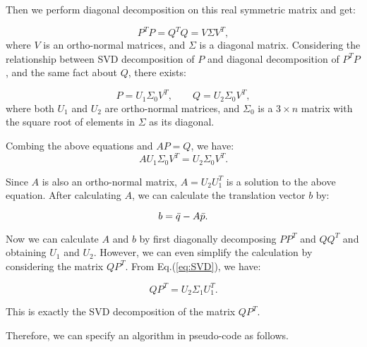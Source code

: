 \documentclass[
  course = {{16-811 Math Fundamentals for Robotics}},
  quartile = {{1}},
  assignment = 1,
  name = {{Kangle Deng}},
  email = {{kangled@andrew.cmu.edu}},
  firstexercise = 1
]{aga-homework}
\begin{document}

Then we perform diagonal decomposition on this real symmetric matrix and get:

\begin{equation*}
    P^TP = Q^TQ = V \Sigma V^T,
\end{equation*}
where $V$ is an ortho-normal matrices, and $\Sigma$ is a diagonal matrix. Considering the relationship between SVD decomposition of $P$ and diagonal decomposition of $P^TP$, and the same fact about $Q$, there exists:

\begin{equation}
    P = U_1\Sigma_0 V^T, \qquad Q = U_2\Sigma_0 V^T,
\label{eq:SVD}
\end{equation}
where both $U_1$ and $U_2$ are ortho-normal matrices, and $\Sigma_0$ is a $3 \times n$ matrix with the square root of elements in $\Sigma$ as its diagonal.

Combing the above equations and $AP=Q$, we have:
\begin{equation*}
    AU_1 \Sigma_0 V^T = U_2\Sigma_0 V^T.
\end{equation*}

Since $A$ is also an ortho-normal matrix, $A=U_2U_1^T$ is a solution to the above equation. After calculating $A$, we can calculate the translation vector $b$ by:

\begin{equation*}
    b = \Bar{q} - A\Bar{p}.
\end{equation*}

Now we can calculate $A$ and $b$ by first diagonally decomposing $PP^T$ and $QQ^T$ and obtaining $U_1$ and $U_2$. However, we can even simplify the calculation by considering the matrix $QP^T$. From Eq.(\ref{eq:SVD}), we have:

\begin{equation*}
    QP^T = U_2 \Sigma_1 U_1^T.
\end{equation*}

This is exactly the SVD decomposition of the matrix $QP^T$.

Therefore, we can specify an algorithm in pseudo-code as follows.
\end{document}
